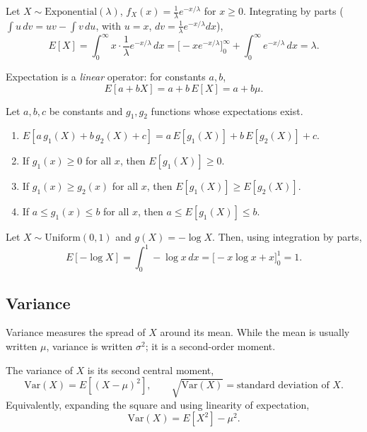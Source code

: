 \documentclass[11pt]{article}
\begin{document}
\begin{example}
Let $X \sim \mathrm{Exponential}(\lambda)$, $f_X(x) = \frac{1}{\lambda}
e^{-x/\lambda}$ for $x \ge 0$. Integrating by parts ($\int u\,dv = uv - \int
v\,du$, with $u = x$, $dv = \frac{1}{\lambda}e^{-x/\lambda}dx$),
\[
  E[X] = \int_0^\infty x \cdot \frac{1}{\lambda} e^{-x/\lambda}\,dx
       = \big[-xe^{-x/\lambda}\big]_0^\infty + \int_0^\infty e^{-x/\lambda}\,dx
       = \lambda.
\]
\end{example}

Expectation is a \emph{linear} operator: for constants $a, b$,
\[
  E[a + bX] = a + b\,E[X] = a + b\mu.
\]

\begin{theorem}
Let $a, b, c$ be constants and $g_1, g_2$ functions whose expectations exist.
\begin{enumerate}
  \item $E[a\,g_1(X) + b\,g_2(X) + c] = a\,E[g_1(X)] + b\,E[g_2(X)] + c$.
  \item If $g_1(x) \ge 0$ for all $x$, then $E[g_1(X)] \ge 0$.
  \item If $g_1(x) \ge g_2(x)$ for all $x$, then $E[g_1(X)] \ge E[g_2(X)]$.
  \item If $a \le g_1(x) \le b$ for all $x$, then $a \le E[g_1(X)] \le b$.
\end{enumerate}
\end{theorem}

\begin{example}
Let $X \sim \mathrm{Uniform}(0,1)$ and $g(X) = -\log X$. Then, using
integration by parts,
\[
  E[-\log X] = \int_0^1 -\log x\,dx = \big[-x\log x + x\big]_0^1 = 1.
\]
\end{example}

\subsection{Variance}

Variance measures the spread of $X$ around its mean. While the mean is
usually written $\mu$, variance is written $\sigma^2$; it is a second-order
moment.

\begin{definition}
The variance of $X$ is its second central moment,
\[
  \mathrm{Var}(X) = E[(X-\mu)^2], \qquad
  \sqrt{\mathrm{Var}(X)} = \text{standard deviation of } X.
\]
Equivalently, expanding the square and using linearity of expectation,
\[
  \mathrm{Var}(X) = E[X^2] - \mu^2.
\]
\end{definition}
\end{document}
